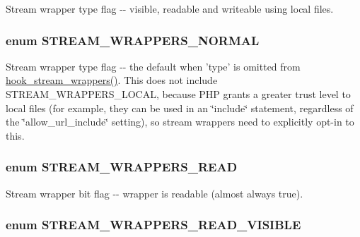 \label{stream__wrappers_8inc_a2c85af579fa282a57c975e99eba90c63}
Stream wrapper type flag -\/-\/ visible, readable and writeable using local files. \hypertarget{stream__wrappers_8inc_a36f5ace0de0c330620586d4f92e9774d}{
\subsubsection[{STREAM\_\-WRAPPERS\_\-NORMAL}]{\setlength{\rightskip}{0pt plus 5cm}enum {\bf STREAM\_\-WRAPPERS\_\-NORMAL}}}
\label{stream__wrappers_8inc_a36f5ace0de0c330620586d4f92e9774d}
Stream wrapper type flag -\/-\/ the default when 'type' is omitted from \hyperlink{group__hooks_ga6fadcf625a4766e7f0d97b1628b294dc}{hook\_\-stream\_\-wrappers()}. This does not include STREAM\_\-WRAPPERS\_\-LOCAL, because PHP grants a greater trust level to local files (for example, they can be used in an \char`\"{}include\char`\"{} statement, regardless of the \char`\"{}allow\_\-url\_\-include\char`\"{} setting), so stream wrappers need to explicitly opt-\/in to this. \hypertarget{stream__wrappers_8inc_afed584acf18401455602dac60e54a5ae}{
\subsubsection[{STREAM\_\-WRAPPERS\_\-READ}]{\setlength{\rightskip}{0pt plus 5cm}enum {\bf STREAM\_\-WRAPPERS\_\-READ}}}
\label{stream__wrappers_8inc_afed584acf18401455602dac60e54a5ae}
Stream wrapper bit flag -\/-\/ wrapper is readable (almost always true). \hypertarget{stream__wrappers_8inc_a2efceeff10f6144584b131d04f87afcc}{
\subsubsection[{STREAM\_\-WRAPPERS\_\-READ\_\-VISIBLE}]{\setlength{\rightskip}{0pt plus 5cm}enum {\bf STREAM\_\-WRAPPERS\_\-READ\_\-VISIBLE}}}
